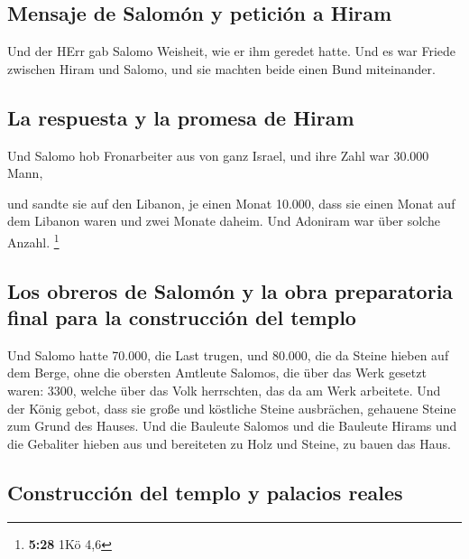 \hypertarget{mensaje-de-salomuxf3n-y-peticiuxf3n-a-hiram}{%
\subsection{Mensaje de Salomón y petición a
Hiram}\label{mensaje-de-salomuxf3n-y-peticiuxf3n-a-hiram}}

 Und der HErr gab Salomo Weisheit, wie er ihm geredet
hatte. Und es war Friede zwischen Hiram und Salomo, und sie machten
beide einen Bund miteinander.

\hypertarget{la-respuesta-y-la-promesa-de-hiram}{%
\subsection{La respuesta y la promesa de
Hiram}\label{la-respuesta-y-la-promesa-de-hiram}}

 Und Salomo hob Fronarbeiter aus von ganz Israel, und
ihre Zahl war 30.000 Mann,

 und sandte sie auf den Libanon, je einen Monat 10.000,
dass sie einen Monat auf dem Libanon waren und zwei Monate daheim. Und
Adoniram war über solche Anzahl. \footnote{\textbf{5:28} 1Kö 4,6}

\hypertarget{los-obreros-de-salomuxf3n-y-la-obra-preparatoria-final-para-la-construcciuxf3n-del-templo}{%
\subsection{Los obreros de Salomón y la obra preparatoria final para la
construcción del
templo}\label{los-obreros-de-salomuxf3n-y-la-obra-preparatoria-final-para-la-construcciuxf3n-del-templo}}

 Und Salomo hatte 70.000, die Last trugen, und 80.000,
die da Steine hieben auf dem Berge,  ohne die obersten
Amtleute Salomos, die über das Werk gesetzt waren: 3300, welche über das
Volk herrschten, das da am Werk arbeitete.  Und der König
gebot, dass sie große und köstliche Steine ausbrächen, gehauene Steine
zum Grund des Hauses.  Und die Bauleute Salomos und die
Bauleute Hirams und die Gebaliter hieben aus und bereiteten zu Holz und
Steine, zu bauen das Haus.

\hypertarget{construcciuxf3n-del-templo-y-palacios-reales}{%
\subsection{Construcción del templo y palacios
reales}\label{construcciuxf3n-del-templo-y-palacios-reales}}

